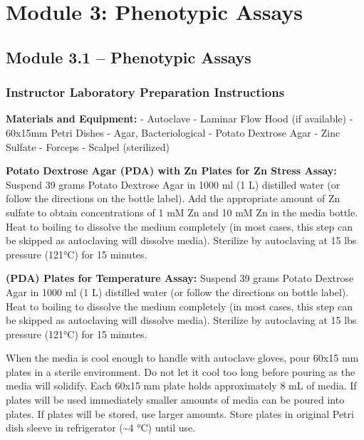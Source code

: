 \documentclass[
  letterpaper,
  DIV=11,
  numbers=noendperiod]{scrreprt}
\begin{document}

\chapter*{Module 3: Phenotypic Assays}\label{module-3-phenotypic-assays}


\section*{Module 3.1 -- Phenotypic
Assays}\label{module-3.1-phenotypic-assays}


\subsection*{Instructor Laboratory Preparation
Instructions}\label{instructor-laboratory-preparation-instructions-2}

\textbf{Materials and Equipment:} - Autoclave - Laminar Flow Hood (if
available) - 60x15mm Petri Dishes - Agar, Bacteriological - Potato
Dextrose Agar - Zinc Sulfate - Forceps - Scalpel (sterilized)

\textbf{Potato Dextrose Agar (PDA) with Zn Plates for Zn Stress Assay:}
Suspend 39 grams Potato Dextrose Agar in 1000 ml (1 L) distilled water
(or follow the directions on the bottle label). Add the appropriate
amount of Zn sulfate to obtain concentrations of 1 mM Zn and 10 mM Zn in
the media bottle. Heat to boiling to dissolve the medium completely (in
most cases, this step can be skipped as autoclaving will dissolve
media). Sterilize by autoclaving at 15 lbs pressure (121°C) for 15
minutes.

\textbf{(PDA) Plates for Temperature Assay:} Suspend 39 grams Potato
Dextrose Agar in 1000 ml (1 L) distilled water (or follow the directions
on bottle label). Heat to boiling to dissolve the medium completely (in
most cases, this step can be skipped as autoclaving will dissolve
media). Sterilize by autoclaving at 15 lbs pressure (121°C) for 15
minutes.

When the media is cool enough to handle with autoclave gloves, pour
60x15 mm plates in a sterile environment. Do not let it cool too long
before pouring as the media will solidify. Each 60x15 mm plate holds
approximately 8 mL of media. If plates will be used immediately smaller
amounts of media can be poured into plates. If plates will be stored,
use larger amounts. Store plates in original Petri dish sleeve in
refrigerator (\textasciitilde4 °C) until use.
\end{document}
